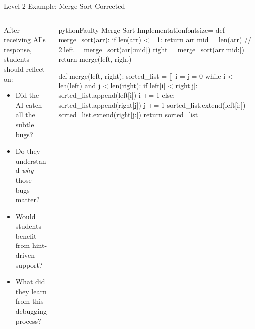\documentclass[xcolor=dvipsnames, aspectratio=169]{beamer}
\begin{document}
\begin{frame}[fragile]{Level 2 Example: Merge Sort Corrected}
  \begin{columns}[T]
    \begin{column}{0.42\textwidth}
      After receiving AI's response, students should reflect on:
      \begin{itemize}
        \item Did the AI catch all the subtle bugs?
        \item Do they understand \textit{why} those bugs matter?
        \item Would students benefit from hint-driven support?
        \item What did they learn from this debugging process?
      \end{itemize}
    \end{column}
    
    \begin{column}{0.52\textwidth}
      \vspace{-1.5em}
      \begin{codeboxtc}{python}{Faulty Merge Sort Implementation}{}{fontsize=\scriptsize}
    def merge_sort(arr):
        if len(arr) <= 1:
            return arr
        mid = len(arr) // 2
        left = merge_sort(arr[:mid])
        right = merge_sort(arr[mid:])
        return merge(left, right)

    def merge(left, right):
        sorted_list = []
        i = j = 0
        while i < len(left) and j < len(right):
            if left[i] < right[j]:
                sorted_list.append(left[i])
                i += 1
            else:
                sorted_list.append(right[j])
                j += 1
        sorted_list.extend(left[i:])
        sorted_list.extend(right[j:])
        return sorted_list\end{codeboxtc}
    \end{column}
  \end{columns}
\end{frame}
\end{document}
